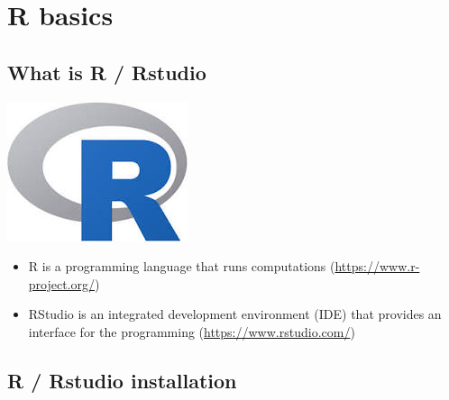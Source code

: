 \documentclass[]{book}
\providecommand{\tightlist}{%
  \setlength{\itemsep}{0pt}\setlength{\parskip}{0pt}}
\begin{document}
\hypertarget{r-basics}{%
\chapter{R basics}\label{r-basics}}

\hypertarget{what-is-r-rstudio}{%
\section{What is R / Rstudio}\label{what-is-r-rstudio}}

\includegraphics{images/r.jpg}

\begin{itemize}
\tightlist
\item
  R is a programming language that runs computations (\url{https://www.r-project.org/})
\item
  RStudio is an integrated development environment (IDE) that provides an interface for the programming (\url{https://www.rstudio.com/})
\end{itemize}

\hypertarget{r-rstudio-installation}{%
\section{R / Rstudio installation}\label{r-rstudio-installation}}
\end{document}
